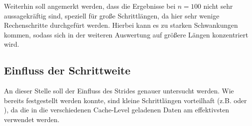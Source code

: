 Weiterhin soll angemerkt werden, dass die Ergebnisse bei $n=100$ nicht sehr
aussagekräftig sind, speziell für große Schrittlängen, da hier sehr wenige Rechenschritte
durchgefürt werden. Hierbei kann es zu starken Schwankungen kommen, sodass sich in
der weiteren Auswertung auf größere Längen konzentriert wird.


\subsection{Einfluss der Schrittweite}
An dieser Stelle soll der Einfluss des Strides genauer untersucht werden. Wie bereits
festgestellt werden konnte, sind kleine Schrittlängen vorteilhaft (z.B. 
oder ), da die in die verschiedenen Cache-Level geladenen Daten am
effektivsten verwendet werden.






% 
% 
% 
% 
% 
% 
% 
% 
% 
% 
% 
% 
% 

